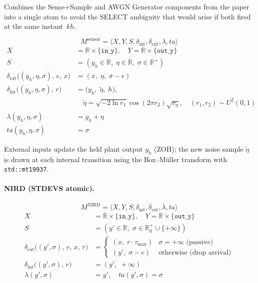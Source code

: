 Combines the Sense+Sample and AWGN Generator components from the paper into
a single atom to avoid the SELECT ambiguity that would arise if both fired
at the same instant~$kh$.

\[
  M^{\mathrm{sensor}} = \langle X, Y, S, \delta_{\mathrm{int}},
    \delta_{\mathrm{ext}}, \lambda, ta \rangle
\]
\begin{align*}
  X &= \mathbb{R}\times\{\texttt{in\_y}\},\quad
  Y  = \mathbb{R}\times\{\texttt{out\_y}\} \\
  S &= (y_h \in \mathbb{R},\;\eta \in \mathbb{R},\;\sigma \in \mathbb{R}^+)\\
  \delta_{\mathrm{ext}}\bigl((y_h,\eta,\sigma),\,e,\,x\bigr)
    &= (x,\;\eta,\;\sigma - e) \\
  \delta_{\mathrm{int}}\bigl((y_h,\eta,\sigma),\,r\bigr)
    &= \bigl(y_h,\;\tilde\eta,\;h\bigr), \\
  &\quad \tilde\eta
       = \sqrt{-2\ln r_1}\cos(2\pi r_2)\sqrt{v_\eta},
       \quad (r_1,r_2)\sim U^2(0,1) \\
  \lambda(y_h,\eta,\sigma) &= y_h + \eta \\
  ta(y_h,\eta,\sigma) &= \sigma
\end{align*}

External inputs update the held plant output $y_h$ (ZOH); the new
noise sample $\tilde\eta$ is drawn at each internal transition using the
Box--M\"uller transform with \texttt{std::mt19937}.

\paragraph{NIRD (STDEVS atomic).}

\[
  M^{\mathrm{NIRD}} = \langle X, Y, S, \delta_{\mathrm{int}},
    \delta_{\mathrm{ext}}, \lambda, ta \rangle
\]
\begin{align*}
  X &= \mathbb{R}\times\{\texttt{in\_y}\},\quad
  Y  = \mathbb{R}\times\{\texttt{out\_y}\} \\
  S &= (y' \in \mathbb{R},\;\sigma \in \mathbb{R}^+_0\cup\{+\infty\}) \\
  \delta_{\mathrm{ext}}\bigl((y',\sigma),\,e,\,x,\,r\bigr)
    &= \begin{cases}
         (x,\;r\cdot\tau_{\max}) & \sigma = +\infty\;\text{(passive)} \\
         (y',\;\sigma - e)       & \text{otherwise (drop arrival)}
       \end{cases} \\
  \delta_{\mathrm{int}}\bigl((y',\sigma),\,r\bigr) &= (y',\;+\infty) \\
  \lambda(y',\sigma) &= y',\quad ta(y',\sigma) = \sigma
\end{align*}

